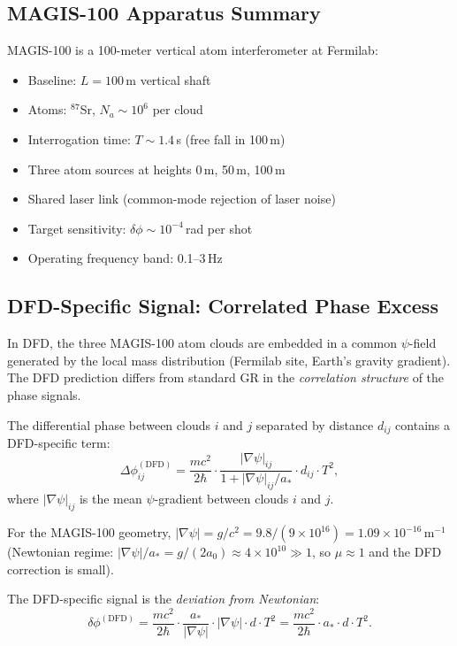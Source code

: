 \documentclass[11pt]{article}
\theoremstyle{definition}
\theoremstyle{remark}
\newcommand{\astar}{a_*}
\begin{document}
\subsection{MAGIS-100 Apparatus Summary}

MAGIS-100 is a 100-meter vertical atom interferometer at Fermilab:
\begin{itemize}
\item Baseline: $L = 100$\,m vertical shaft
\item Atoms: $^{87}$Sr, $N_a \sim 10^6$ per cloud
\item Interrogation time: $T \sim 1.4$\,s (free fall in 100\,m)
\item Three atom sources at heights 0\,m, 50\,m, 100\,m
\item Shared laser link (common-mode rejection of laser noise)
\item Target sensitivity: $\delta\phi \sim 10^{-4}$\,rad per shot
\item Operating frequency band: 0.1--3\,Hz
\end{itemize}

\subsection{DFD-Specific Signal: Correlated Phase Excess}

In DFD, the three MAGIS-100 atom clouds are embedded in a common
$\psi$-field generated by the local mass distribution (Fermilab site,
Earth's gravity gradient). The DFD prediction differs from standard
GR in the \emph{correlation structure} of the phase signals.

The differential phase between clouds $i$ and $j$ separated by
distance $d_{ij}$ contains a DFD-specific term:
\begin{equation}
\Delta\phi_{ij}^{(\mathrm{DFD})} = \frac{mc^2}{2\hbar} \cdot
\frac{|\nabla\psi|_{ij}}{1 + |\nabla\psi|_{ij}/\astar} \cdot d_{ij} \cdot T^2,
\label{eq:magis-dfd}
\end{equation}
where $|\nabla\psi|_{ij}$ is the mean $\psi$-gradient between clouds
$i$ and $j$.

For the MAGIS-100 geometry, $|\nabla\psi| = g/c^2 = 9.8/(9\times 10^{16})
= 1.09 \times 10^{-16}$\,m$^{-1}$ (Newtonian regime: $|\nabla\psi|/\astar
= g/(2a_0) \approx 4 \times 10^{10} \gg 1$, so $\mu \approx 1$ and
the DFD correction is small).

The DFD-specific signal is the \emph{deviation from Newtonian}:
\begin{equation}
\delta\phi^{(\mathrm{DFD})} = \frac{mc^2}{2\hbar} \cdot
\frac{\astar}{|\nabla\psi|} \cdot |\nabla\psi| \cdot d \cdot T^2
= \frac{mc^2}{2\hbar} \cdot \astar \cdot d \cdot T^2.
\end{equation}
\end{document}
